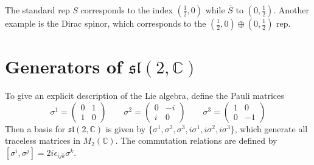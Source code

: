 The standard rep  $S$ corresponds to the index $(\frac{1}{2},0)$ while 
$\overline{S}$ to $(0,\frac{1}{2})$. Another example is the Dirac spinor, which
corresponds to the $(\frac{1}{2},0)\oplus (0,\frac{1}{2})$ rep. 

\section{Generators of \texorpdfstring{$\mathfrak{sl}(2,\mathbb{C})$}{sl(2,C)}}
\begin{comment}
The vector representation of $\SL(2,\mathbb{C})$ is defined as $(\frac{1}{2},0)\otimes
(0,\frac{1}{2})\simeq (\frac{1}{2},\frac{1}{2})$, where the isomorphism comes
from the Clebsch-Gordan rule. %
To explicitly construct the representation, we use the Pauli matrices
 
The action of $M\in
\SL(2,\mathbb{C})$ is given by $x_{\mu} \mapsto M(\sigma^\mu x_{\mu})M^{\dagger}$

$(\sigma^{\mu\nu})_{\alpha}{}^{\beta}$ is a homomorphism 
$S\otimes \overline{S} \to $ to the vector representation of $\SO(1,3)$ 
\end{comment}
To give an explicit description of the Lie algebra, define the Pauli matrices
\[
\sigma^1 = 
\begin{pmatrix}
	0 & 1 \\ 1 & 0
\end{pmatrix}
\qquad \sigma^2 = 
\begin{pmatrix}
	0 & -i \\ i & 0
\end{pmatrix}
\qquad \sigma^3 = 
\begin{pmatrix}
	1 & 0 \\ 0 & -1
\end{pmatrix}
\]
Then a basis for $\mathfrak{sl}(2,\mathbb{C})$ is given by
$\{\sigma^1,\sigma^2,\sigma^3,i\sigma^1,i\sigma^2,i\sigma^3\}$, which generate
all traceless matrices in $M_2(\mathbb{C})$. The commutation relations are
defined by $[\sigma^i,\sigma^j] = 2i\epsilon_{ijk}\sigma^k$. 

